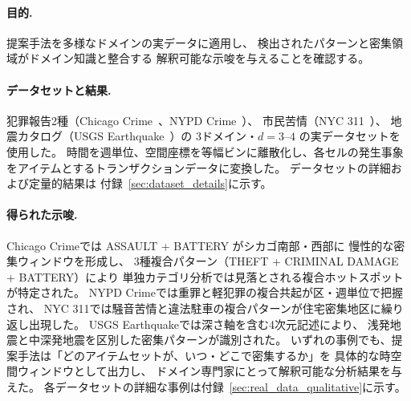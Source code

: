 \paragraph{目的.}
提案手法を多様なドメインの実データに適用し、
検出されたパターンと密集領域がドメイン知識と整合する
解釈可能な示唆を与えることを確認する。

\paragraph{データセットと結果.}
犯罪報告2種（Chicago Crime~\cite{chicagocrime}、NYPD Crime~\cite{nypdcrime}）、
市民苦情（NYC 311~\cite{nyc311}）、
地震カタログ（USGS Earthquake~\cite{usgseq}）の
3ドメイン・$d{=}3$--$4$ の実データセットを使用した。
時間を週単位、空間座標を等幅ビンに離散化し、各セルの発生事象をアイテムとするトランザクションデータに変換した。
データセットの詳細および定量的結果は
付録~\ref{sec:dataset_details}に示す。

\paragraph{得られた示唆.}
Chicago Crimeでは ASSAULT + BATTERY がシカゴ南部・西部に
慢性的な密集ウィンドウを形成し、
3種複合パターン（THEFT + CRIMINAL DAMAGE + BATTERY）により
単独カテゴリ分析では見落とされる複合ホットスポットが特定された。
NYPD Crimeでは重罪と軽犯罪の複合共起が区・週単位で把握され、
NYC 311では騒音苦情と違法駐車の複合パターンが住宅密集地区に繰り返し出現した。
USGS Earthquakeでは深さ軸を含む4次元記述により、
浅発地震と中深発地震を区別した密集パターンが識別された。
いずれの事例でも、提案手法は「どのアイテムセットが、いつ・どこで密集するか」を
具体的な時空間ウィンドウとして出力し、
ドメイン専門家にとって解釈可能な分析結果を与えた。
各データセットの詳細な事例は付録~\ref{sec:real_data_qualitative}に示す。
